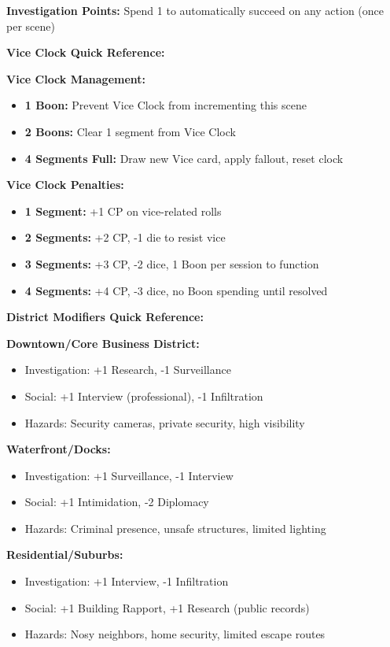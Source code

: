 \documentclass[11pt]{article}
\begin{document}
\textbf{Investigation Points:} Spend 1 to automatically succeed on any action (once per scene)

\textbf{Vice Clock Quick Reference:}

\textbf{Vice Clock Management:}
\begin{itemize}
    \item \textbf{1 Boon:} Prevent Vice Clock from incrementing this scene
    \item \textbf{2 Boons:} Clear 1 segment from Vice Clock
    \item \textbf{4 Segments Full:} Draw new Vice card, apply fallout, reset clock
\end{itemize}

\textbf{Vice Clock Penalties:}
\begin{itemize}
    \item \textbf{1 Segment:} +1 CP on vice-related rolls
    \item \textbf{2 Segments:} +2 CP, -1 die to resist vice
    \item \textbf{3 Segments:} +3 CP, -2 dice, 1 Boon per session to function
    \item \textbf{4 Segments:} +4 CP, -3 dice, no Boon spending until resolved
\end{itemize}

\textbf{District Modifiers Quick Reference:}

\textbf{Downtown/Core Business District:}
\begin{itemize}
    \item Investigation: +1 Research, -1 Surveillance
    \item Social: +1 Interview (professional), -1 Infiltration
    \item Hazards: Security cameras, private security, high visibility
\end{itemize}

\textbf{Waterfront/Docks:}
\begin{itemize}
    \item Investigation: +1 Surveillance, -1 Interview
    \item Social: +1 Intimidation, -2 Diplomacy
    \item Hazards: Criminal presence, unsafe structures, limited lighting
\end{itemize}

\textbf{Residential/Suburbs:}
\begin{itemize}
    \item Investigation: +1 Interview, -1 Infiltration
    \item Social: +1 Building Rapport, +1 Research (public records)
    \item Hazards: Nosy neighbors, home security, limited escape routes
\end{itemize}
\end{document}
